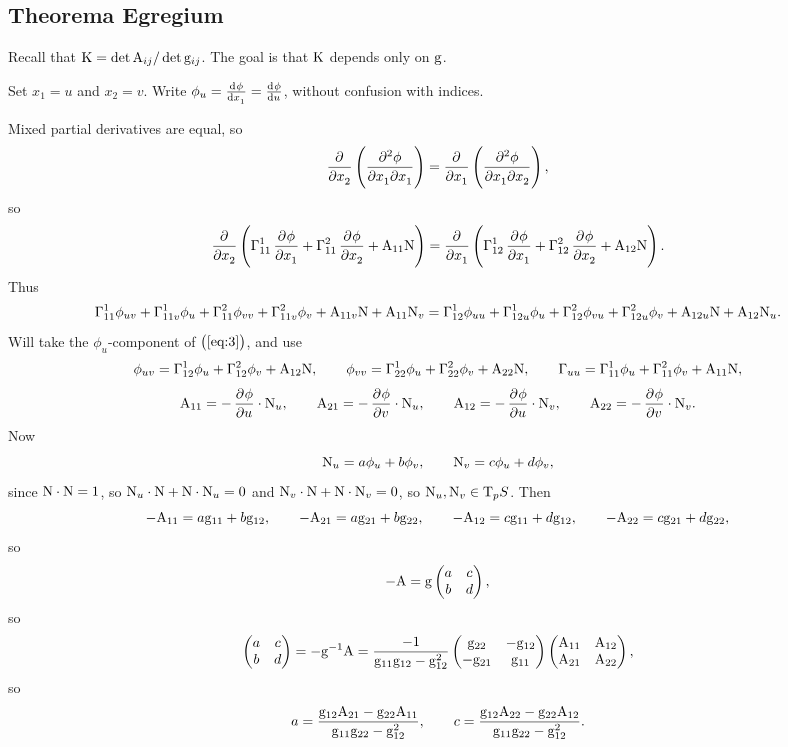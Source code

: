\pagebreak

\subsection{Theorema Egregium}


Recall that $ \mathrm{K} = \det \mathrm{A}_{ij} / \det \mathrm{g}_{ij} $. The goal is that $ \mathrm{K} $ depends only on $ \mathrm{g} $.

\begin{notation*}
Set $ x_1 = u $ and $ x_2 = v $. Write $ \phi_u = \tod{\phi}{x_1} = \tod{\phi}{u} $, without confusion with indices.
\end{notation*}

Mixed partial derivatives are equal, so
$$ \dpd{}{x_2}\br{\dmd{\phi}{2}{x_1}{}{x_1}{}} = \dpd{}{x_1}\br{\dmd{\phi}{2}{x_1}{}{x_2}{}}, $$
so
$$ \dpd{}{x_2}\br{\Gamma_{11}^1\dpd{\phi}{x_1} + \Gamma_{11}^2\dpd{\phi}{x_2} + \A_{11}\N} = \dpd{}{x_1}\br{\Gamma_{12}^1\dpd{\phi}{x_1} + \Gamma_{12}^2\dpd{\phi}{x_2} + \A_{12}\N}. $$
Thus
\begin{equation}
\label{eq:3}
\Gamma_{11}^1\phi_{uv} + \Gamma_{11v}^1\phi_u + \Gamma_{11}^2\phi_{vv} + \Gamma_{11v}^2\phi_v + \mathrm{A}_{11v}\mathrm{N} + \mathrm{A}_{11}\mathrm{N}_v = \Gamma_{12}^1\phi_{uu} + \Gamma_{12u}^1\phi_u + \Gamma_{12}^2\phi_{vu} + \Gamma_{12u}^2\phi_v + \mathrm{A}_{12u}\mathrm{N} + \mathrm{A}_{12}\mathrm{N}_u.
\end{equation}
Will take the $ \phi_u $-component of $ \br{\ref{eq:3}} $, and use
$$ \phi_{uv} = \Gamma_{12}^1\phi_u + \Gamma_{12}^2\phi_v + \mathrm{A}_{12}\mathrm{N}, \qquad \phi_{vv} = \Gamma_{22}^1\phi_u + \Gamma_{22}^2\phi_v + \mathrm{A}_{22}\mathrm{N}, \qquad \Gamma_{uu} = \Gamma_{11}^1\phi_u + \Gamma_{11}^2\phi_v + \mathrm{A}_{11}\mathrm{N}, $$
$$ \A_{11} = -\dpd{\phi}{u} \cdot \N_u, \qquad \A_{21} = -\dpd{\phi}{v} \cdot \N_u, \qquad \A_{12} = -\dpd{\phi}{u} \cdot \N_v, \qquad \A_{22} = -\dpd{\phi}{v} \cdot \N_v. $$
Now
$$ \mathrm{N}_u = a\phi_u + b\phi_v, \qquad \mathrm{N}_v = c\phi_u + d\phi_v, $$
since $ \mathrm{N} \cdot \mathrm{N} = 1 $, so $ \mathrm{N}_u \cdot \mathrm{N} + \mathrm{N} \cdot \mathrm{N}_u = 0 $ and $ \mathrm{N}_v \cdot \mathrm{N} + \mathrm{N} \cdot \mathrm{N}_v = 0 $, so $ \mathrm{N}_u, \mathrm{N}_v \in \mathrm{T}_p S $. Then
$$ -\mathrm{A}_{11} = a\mathrm{g}_{11} + b\mathrm{g}_{12}, \qquad -\mathrm{A}_{21} = a\mathrm{g}_{21} + b\mathrm{g}_{22}, \qquad -\mathrm{A}_{12} = c\mathrm{g}_{11} + d\mathrm{g}_{12}, \qquad -\mathrm{A}_{22} = c\mathrm{g}_{21} + d\mathrm{g}_{22}, $$
so
$$ -\mathrm{A} = \mathrm{g}\begin{pmatrix} a & c \\ b & d \end{pmatrix}, $$
so
$$ \begin{pmatrix} a & c \\ b & d \end{pmatrix} = -\mathrm{g}^{-1}\mathrm{A} = \dfrac{-1}{\mathrm{g}_{11}\mathrm{g}_{12} - \mathrm{g}_{12}^2}\begin{pmatrix} \mathrm{g}_{22} & -\mathrm{g}_{12} \\ -\mathrm{g}_{21} & \mathrm{g}_{11} \end{pmatrix}\begin{pmatrix} \mathrm{A}_{11} & \mathrm{A}_{12} \\ \mathrm{A}_{21} & \mathrm{A}_{22} \end{pmatrix}, $$
so
$$ a = \dfrac{\mathrm{g}_{12}\mathrm{A}_{21} - \mathrm{g}_{22}\mathrm{A}_{11}}{\mathrm{g}_{11}\mathrm{g}_{22} - \mathrm{g}_{12}^2}, \qquad c = \dfrac{\mathrm{g}_{12}\mathrm{A}_{22} - \mathrm{g}_{22}\mathrm{A}_{12}}{\mathrm{g}_{11}\mathrm{g}_{22} - \mathrm{g}_{12}^2}. $$
